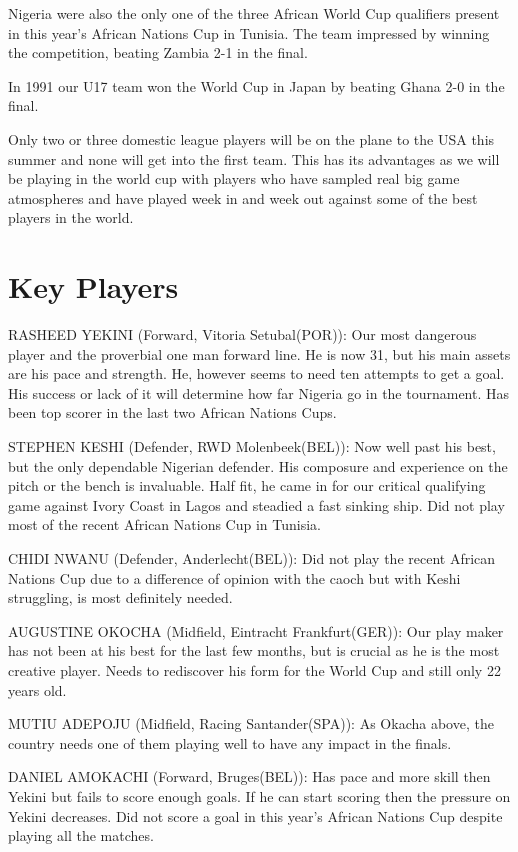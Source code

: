 Nigeria were also the only one of the three African World Cup qualifiers 
present in this year's African Nations Cup in Tunisia. The team impressed by
winning the competition, beating Zambia 2-1 in the final.

In 1991 our U17 team won the World Cup in Japan by beating Ghana 2-0 in the 
final.

Only two or three domestic league players will be on the plane to the USA this 
summer and none will get into the first team. This has its advantages as we 
will be playing in the world cup with players who have sampled real big game 
atmospheres and have played week in and week out against some of the best 
players in the world.
\section{Key Players}
RASHEED YEKINI (Forward, Vitoria Setubal(POR)):
Our most dangerous player and the proverbial one man forward line. He is now 
31, but his main assets are his pace and strength. He, however seems to need 
ten attempts to get a goal. His success or lack of it will determine how far 
Nigeria go in the tournament. Has been top scorer in the last two African
Nations Cups.

STEPHEN KESHI (Defender, RWD Molenbeek(BEL)): 
Now well past his best, but the only dependable Nigerian defender. His 
composure and experience on the pitch or the bench is invaluable. Half fit, he 
came in for our critical qualifying game against Ivory Coast in Lagos and 
steadied a fast sinking ship. Did not play most of the recent African Nations
Cup in Tunisia.

CHIDI NWANU (Defender, Anderlecht(BEL)):
Did not play the recent African Nations Cup due to a difference of opinion 
with the caoch but with Keshi struggling, is most definitely needed.

AUGUSTINE OKOCHA (Midfield, Eintracht Frankfurt(GER)): 
Our play maker has not been at his best for the last few months, but is 
crucial as he is the most creative player. Needs to rediscover his form for 
the World Cup and still only 22 years old.

MUTIU ADEPOJU (Midfield, Racing Santander(SPA)): 
As Okacha above, the country needs one of them playing well to have any impact 
in the finals.

DANIEL AMOKACHI (Forward, Bruges(BEL)): 
Has pace and more skill then Yekini but fails to score enough goals. If he can 
start scoring then the pressure on Yekini decreases. Did not score a goal in 
this year's African Nations Cup despite playing all the matches.

